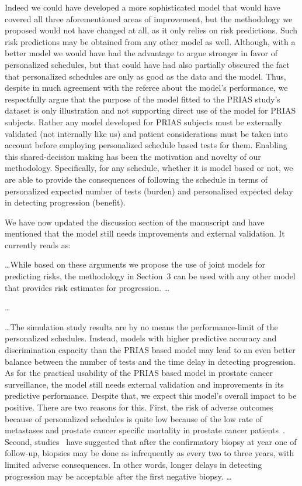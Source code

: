 \begin{enumerate}
Indeed we could have developed a more sophisticated model that would have covered all three aforementioned areas of improvement, but the methodology we proposed would not have changed at all, as it only relies on risk predictions. Such risk predictions may be obtained from any other model as well. Although, with a better model we would have had the advantage to argue stronger in favor of personalized schedules, but that could have had also partially obscured the fact that personalized schedules are only as good as the data and the model. Thus, despite in much agreement with the referee about the model's performance, we respectfully argue that the purpose of the model fitted to the PRIAS study's dataset is only illustration and not supporting direct use of the model for PRIAS subjects. Rather any model developed for PRIAS subjects must be externally validated (not internally like us) and patient considerations must be taken into account before employing personalized schedule based tests for them. Enabling this shared-decision making has been the motivation and novelty of our methodology. Specifically, for any schedule, whether it is model based or not, we are able to provide the consequences of following the schedule in terms of personalized expected number of tests (burden) and personalized expected delay in detecting progression (benefit). 

We have now updated the discussion section of the manuscript and have mentioned that the model still needs improvements and external validation. It currently reads as:
\begin{shadequote}
\ldots While based on these arguments we propose the use of joint models for predicting risks, the methodology in Section~3 can be used with any other model that provides risk estimates for progression. \ldots 

\ldots

\ldots The simulation study results are by no means the performance-limit of the personalized schedules. Instead, models with higher predictive accuracy and discrimination capacity than the PRIAS based model may lead to an even better balance between the number of tests and the time delay in detecting progression. As for the practical usability of the PRIAS based model in prostate cancer surveillance, the model still needs external validation and improvements in its predictive performance. Despite that, we expect this model's overall impact to be positive. There are two reasons for this. First, the risk of adverse outcomes because of personalized schedules is quite low because of the low rate of metastases and prostate cancer specific mortality in prostate cancer patients~\citep{bokhorst2015compliance}. Second, studies~\citep{carvalho,inoue2018comparative} have suggested that after the confirmatory biopsy at year one of follow-up, biopsies may be done as infrequently as every two to three years, with limited adverse consequences. In other words, longer delays in detecting progression may be acceptable after the first negative biopsy. \ldots
\end{shadequote}


\end{enumerate}
